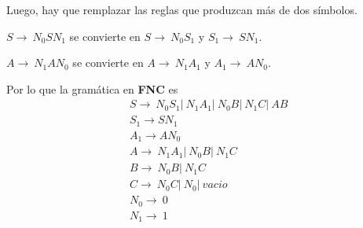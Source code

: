 \documentclass{article}
\begin{document}
\begin{enumerate}
\begin{enumerate}
        Luego, hay que remplazar las reglas que produzcan más de dos símbolos.

        $S \rightarrow \ N_0SN_1$ se convierte en $S \rightarrow \ N_0S_1$ y 
        $S_1 \rightarrow \ SN_1$.

       

        $A \rightarrow \ N_1AN_0$ se convierte en $A \rightarrow \ N_1A_1$ y 
        $A_1 \rightarrow \ AN_0$.


        Por lo que la gramática en \textbf{FNC} es 
        \begin{align*}
        	&S \rightarrow \ N_0S_1 |\ N_1A_1 |\  N_0B |\ N_1C |\ AB \\
        	&S_1 \rightarrow SN_1\\
        	&A_1 \rightarrow AN_0\\
        	&A \rightarrow \ N_1A_1 |\ N_0B |\ N_1C \\
        	&B \rightarrow \ N_0B |\ N_1C \\
        	&C \rightarrow \ N_0C |\ N_0 |\ vacio \\
        	&N_0 \rightarrow \ 0 \\
        	&N_1 \rightarrow \ 1
        \end{align*}
    \end{enumerate}
\end{enumerate}
\end{document}
